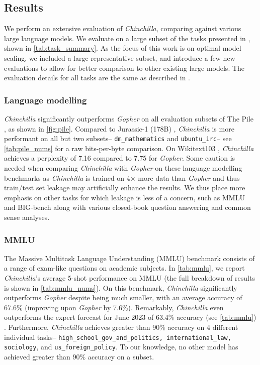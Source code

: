 \subsection{Results}
\label{sec:model_analysis}
We perform an extensive evaluation of \textit{Chinchilla}, comparing against various large language models. We evaluate on a large subset of the tasks presented in \citet{rae2021gopher}, shown in \autoref{tab:task_summary}.
As the focus of this work is on optimal model scaling, we included a large representative subset, and introduce a few new evaluations to allow for better comparison to other existing large models. The evaluation details for all tasks are the same as described in \citet{rae2021gopher}.

\subsubsection{Language modelling}

\textit{Chinchilla} significantly outperforms \textit{Gopher} on all evaluation subsets of The Pile \citep{pile}, as shown in \autoref{fig:pile}.
Compared to Jurassic-1 (178B) \cite{jurassic}, \textit{Chinchilla} is more performant on all but two subsets-- \texttt{dm\_mathematics} and \texttt{ubuntu\_irc}-- see \autoref{tab:pile_nums} for a raw bits-per-byte comparison. On Wikitext103 \citep{wikitext103}, \textit{Chinchilla} achieves a perplexity of 7.16 compared to 7.75 for \textit{Gopher}.
Some caution is needed when comparing \textit{Chinchilla} with \textit{Gopher} on these language modelling benchmarks as \textit{Chinchilla} is trained on 4$\times$ more data than \textit{Gopher} and thus train/test set leakage may artificially enhance the results. We thus place more emphasis on other tasks for which leakage is less of a concern, such as MMLU \citep{hendrycks2020measuring} and BIG-bench \citep{bigbench} along with various closed-book question answering and common sense analyses.

\subsubsection{MMLU}

The Massive Multitask Language Understanding (MMLU) benchmark \citep{hendrycks2020measuring} consists of a range of exam-like questions on academic subjects. In \autoref{tab:mmlu}, we report \textit{Chinchilla}'s average 5-shot performance on MMLU (the full breakdown of results is shown in \autoref{tab:mmlu_nums}).
On this benchmark, \textit{Chinchilla} significantly outperforms \textit{Gopher} despite being much smaller, with an average accuracy of 67.6\% (improving upon \textit{Gopher}  by 7.6\%).
Remarkably, \textit{Chinchilla} even outperforms the expert forecast for June 2023 of 63.4\% accuracy (see \autoref{tab:mmlu}) \citep{forecast_blog}. Furthermore, \textit{Chinchilla} achieves greater than 90\% accuracy on 4 different individual tasks-- \texttt{high\_school\_gov\_and\_politics, international\_law, sociology}, and \texttt{us\_foreign\_policy}. To our knowledge, no other model has achieved greater than 90\% accuracy on a subset. 

